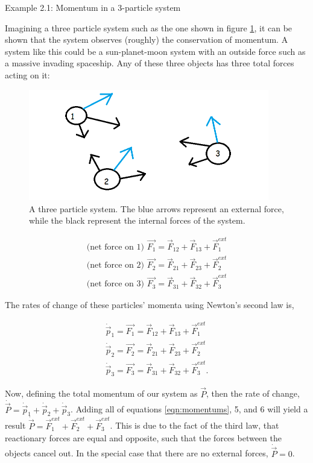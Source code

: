 {\exbegin Example 2.1: Momentum in a 3-particle system}

Imagining a three particle system such as the one shown in figure \ref{fig:three-part-sys}, it can be shown that the system observes (roughly) the conservation of momentum. A system like this could be a sun-planet-moon system with an outside force such as a massive invading spaceship. Any of these three objects has three total forces acting on it:

\begin{figure}
    \centering
    \includegraphics[width=10.5cm]{Classical_Mechanics/2.2-Newton/three-particle-sys.png}
    \caption{A three particle system. The blue arrows represent an external force, while the black represent the internal forces of the system.}
    \label{fig:three-part-sys}
\end{figure}

\begin{align}
    \text{(net force on 1) } \vec{F_1} = \vec{F}_{12} + \vec{F}_{13} + \vec{F}_1^{ext} \\
    \text{(net force on 2) } \vec{F_2} = \vec{F}_{21} + \vec{F}_{23} + \vec{F}_2^{ext} \\
    \text{(net force on 3) } \vec{F_3} = \vec{F}_{31} + \vec{F}_{32} + \vec{F}_3^{ext}
\end{align}

\noindent The rates of change of these particles' momenta using Newton's second law is,

\begin{align}
    \label{eqn:momentums}
    \dot \vec{p}_1 = \vec{F_1} = \vec{F}_{12} + \vec{F}_{13} + \vec{F}_1^{ext} \\
    \dot \vec{p}_2 = \vec{F_2} = \vec{F}_{21} + \vec{F}_{23} + \vec{F}_2^{ext} \\
    \dot \vec{p}_3 = \vec{F_3} = \vec{F}_{31} + \vec{F}_{32} + \vec{F}_3^{ext}.
\end{align}

\noindent Now, defining the total momentum of our system as $\vec{P}$, then the rate of change, $\dot \vec{P} = \dot \vec{p}_1 + \dot \vec{p}_2 + \dot \vec{p}_3$. Adding all of equations \ref{eqn:momentums}, 5, and 6 will yield a result $\dot \vec{P} = \vec{F}^{ext}_1 + \vec{F}^{ext}_2 + \vec{F}^{ext}_3$. This is due to the fact of the third law, that reactionary forces are equal and opposite, such that the forces between the objects cancel out. In the special case that there are no external forces, $\dot \vec{P} = 0$.

